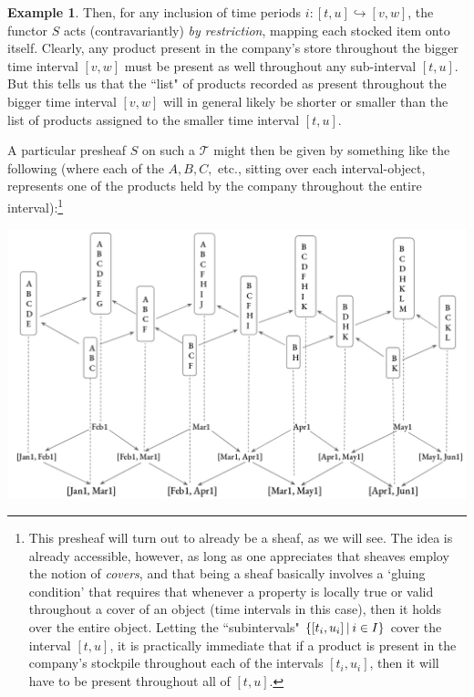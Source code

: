 \documentclass[a4paper]{book}
\theoremstyle{definition}
\newtheorem{example}{Example}[section]
\theoremstyle{definition}
\theoremstyle{definition}
\theoremstyle{theorem}
\theoremstyle{definition}
\begin{document}
\begin{example}
Then, for any inclusion of time periods $i: [t,u] \hookrightarrow [v,w]$, the functor $S$ acts (contravariantly) \textit{by restriction}, mapping each stocked item onto itself. Clearly, any product present in the company's store throughout the bigger time interval $[v,w]$ must be present as well throughout any sub-interval $[t,u]$. But this tells us that the ``list" of products recorded as present throughout the bigger time interval $[v,w]$ will in general likely be shorter or smaller than the list of products assigned to the smaller time interval $[t,u]$. \par 
A particular presheaf $S$ on such a $\mathcal{T}$ might then be given by something like the following (where each of the $A, B, C,$ etc., sitting over each interval-object, represents one of the products held by the company throughout the entire interval):\footnote{This presheaf will turn out to already be a sheaf, as we will see. The idea is already accessible, however, as long as one appreciates that sheaves employ the notion of \textit{covers}, and that being a sheaf basically involves a `gluing condition' that requires that whenever a property is locally true or valid throughout a cover of an object (time intervals in this case), then it holds over the entire object. Letting the ``subintervals" $\{[t_i, u_i] \hspace*{0.2em}|\hspace*{0.2em} i \in I \}$ cover the interval $[t,u]$, it is practically immediate that if a product is present in the company's stockpile throughout each of the intervals $[t_i, u_i]$, then it will have to be present throughout all of $[t,u]$.} 
\begin{center}
	\includegraphics*[scale=0.3]{TimeIntervalSheafDiagram.png}
\end{center}

\end{example}
\end{document}
